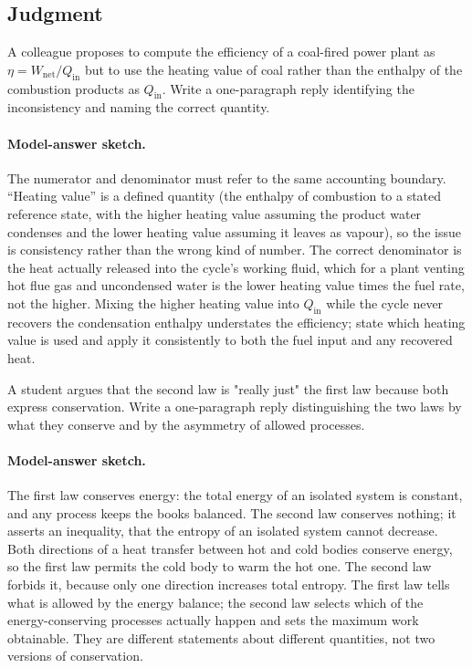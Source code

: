 \subsection*{Judgment}

\begin{exercise}
A colleague proposes to compute the efficiency of a coal-fired power
plant as $\eta = W_{\text{net}}/Q_{\text{in}}$ but to use the heating
value of coal rather than the enthalpy of the combustion products as
$Q_{\text{in}}$. Write a one-paragraph reply identifying the
inconsistency and naming the correct quantity.
\paragraph{Model-answer sketch.} The numerator and denominator must
refer to the same accounting boundary. ``Heating value'' is a defined
quantity (the enthalpy of combustion to a stated reference state, with
the higher heating value assuming the product water condenses and the
lower heating value assuming it leaves as vapour), so the issue is
consistency rather than the wrong kind of number. The correct
denominator is the heat actually released into the cycle's working
fluid, which for a plant venting hot flue gas and uncondensed water is
the lower heating value times the fuel rate, not the higher. Mixing the
higher heating value into $Q_{\text{in}}$ while the cycle never recovers
the condensation enthalpy understates the efficiency; state which
heating value is used and apply it consistently to both the fuel input
and any recovered heat.
\end{exercise}

\begin{exercise}
A student argues that the second law is "really just" the first law
because both express conservation. Write a one-paragraph reply
distinguishing the two laws by what they conserve and by the
asymmetry of allowed processes.
\paragraph{Model-answer sketch.} The first law conserves energy: the
total energy of an isolated system is constant, and any process keeps
the books balanced. The second law conserves nothing; it asserts an
inequality, that the entropy of an isolated system cannot decrease.
Both directions of a heat transfer between hot and cold bodies conserve
energy, so the first law permits the cold body to warm the hot one. The
second law forbids it, because only one direction increases total
entropy. The first law tells what is allowed by the energy balance; the
second law selects which of the energy-conserving processes actually
happen and sets the maximum work obtainable. They are different
statements about different quantities, not two versions of
conservation.
\end{exercise}

